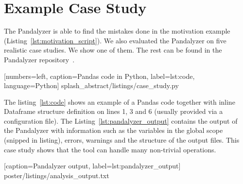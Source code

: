 \section{Example Case Study}

The Pandalyzer is able to find the mistakes done in the motivation example (Listing~\ref{lst:motivation_script}).
We also evaluated the Pandalyzer on five realistic case studies.
We show one of them.
The rest can be found in the Pandalyzer repository~\cite{pandalyzer}.





[numbers=left, caption=Pandas code in Python, label={lst:code}, language=Python]
{splash_abstract/listings/case_study.py}

The listing~\ref{lst:code} shows an example of a Pandas code together with inline Dataframe structure definition
on lines 1, 3 and 6 (usually provided via a configuration file).
The Listing~\ref{lst:pandalyzer_output} contains the output of the Pandalyzer with information such as the variables
in the global scope (snipped in listing), errors, warnings and the structure of the output files.
This case study shows that the tool can handle many non-trivial operations.


[caption=Pandalyzer output, label={lst:pandalyzer_output}]
{poster/listings/analysis_output.txt}
